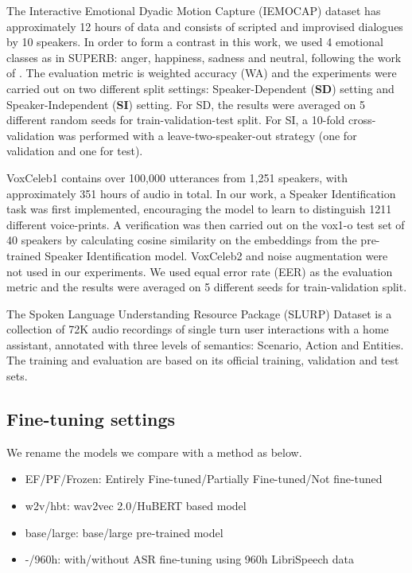 \documentclass{article}
\begin{document}
The Interactive Emotional Dyadic Motion Capture (IEMOCAP) dataset has approximately 12 hours of data and consists of scripted and improvised dialogues by 10 speakers. In order to form a contrast in this work, we used 4 emotional classes as in SUPERB: anger, happiness, sadness and neutral, following the work of \cite{IEMOCAP-relabel}. The evaluation metric is weighted accuracy (WA) and the experiments were carried out on two different split settings: Speaker-Dependent (\textbf{SD}) setting and Speaker-Independent (\textbf{SI}) setting. For SD, the results were averaged on 5 different random seeds for train-validation-test split. For SI, a 10-fold cross-validation was performed with a leave-two-speaker-out strategy (one for validation and one for test).





VoxCeleb1 contains over 100,000 utterances from 1,251 speakers, with approximately 351 hours of audio in total. In our work, a Speaker Identification task was first implemented, encouraging the model to learn to distinguish 1211 different voice-prints. A verification was then carried out on the vox1-o test set of 40 speakers by calculating cosine similarity on the embeddings from the pre-trained Speaker Identification model. VoxCeleb2 and noise augmentation were not used in our experiments. We used equal error rate (EER) as the evaluation metric and the results were averaged on 5 different seeds for train-validation split.




The Spoken Language Understanding Resource Package (SLURP) Dataset is a collection of 72K audio recordings of single turn user interactions with a home assistant, annotated with three levels of semantics: Scenario, Action and Entities. The training and evaluation are based on its official training, validation and test sets.

\subsection{Fine-tuning settings}
We rename the models we compare with a method as below.
\begin{itemize}
    \item  EF/PF/Frozen: Entirely Fine-tuned/Partially Fine-tuned/Not fine-tuned
    \item  w2v/hbt: wav2vec 2.0/HuBERT based model
    \item  base/large: base/large pre-trained model
    \item  -/960h: with/without ASR fine-tuning using 960h LibriSpeech data
\end{itemize}
\end{document}
